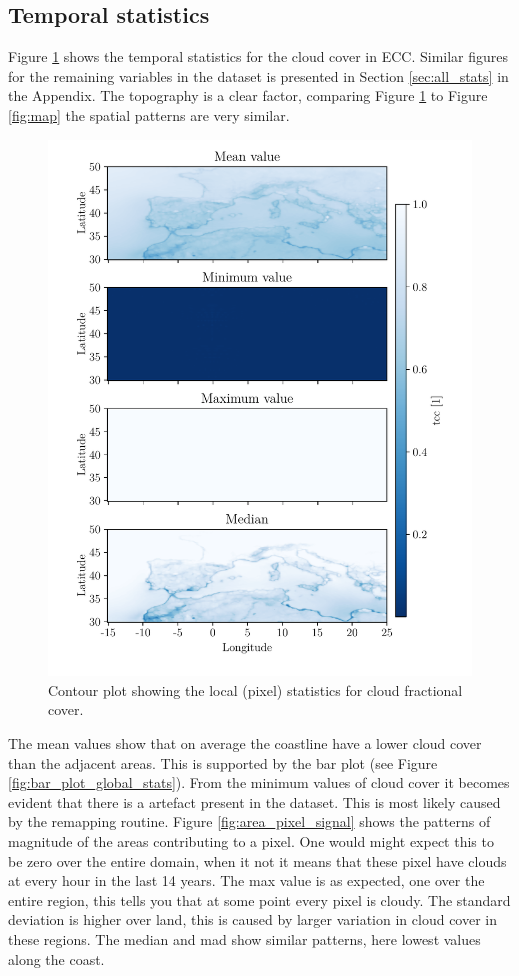 \subsection{Temporal statistics}
Figure \ref{fig:all_stats_tcc} shows the temporal statistics for the cloud cover in ECC. Similar figures for the remaining variables in the dataset is presented in Section \ref{sec:all_stats} in the Appendix.  The topography is a clear factor, comparing Figure \ref{fig:all_stats_tcc} to Figure \ref{fig:map} the spatial patterns are very similar. 
\begin{figure}[ht]
    \centering
    \includegraphics{python_figs/all_stat_variable_tcc.pdf}
    \caption{Contour plot showing the local (pixel) statistics for cloud fractional cover.}
    \label{fig:all_stats_tcc}
\end{figure}

The mean values show that on average the coastline have a lower cloud cover than the adjacent areas. This is supported by the bar plot (see Figure \ref{fig:bar_plot_global_stats}). From the minimum values of cloud cover it becomes evident that there is a  artefact present in the dataset. This is most likely caused by the remapping routine. Figure \ref{fig:area_pixel_signal} shows the patterns of magnitude of the areas contributing to a pixel. One would might expect this to be zero over the entire domain, when it not it means that these pixel have clouds at every hour in the last 14 years. The max value is as expected, one over the entire region, this tells you that at some point every pixel is cloudy. The standard deviation is higher over land, this is caused by larger variation in cloud cover in these regions. The median and mad show similar patterns, here lowest values along the coast.

